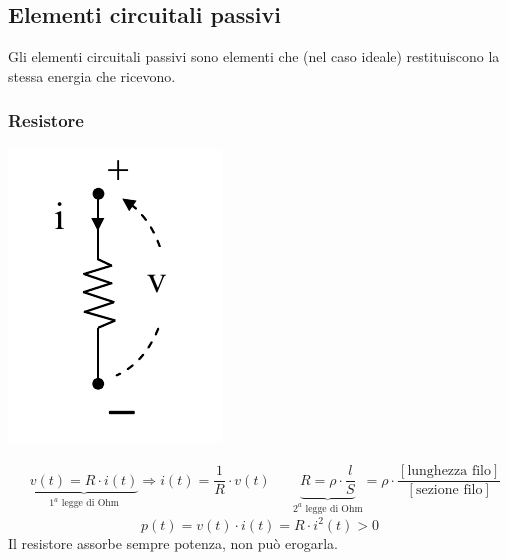 \documentclass{article}
\begin{document}
\subsection{Elementi circuitali passivi}
Gli elementi circuitali passivi sono elementi che (nel caso ideale) restituiscono la stessa energia che ricevono. 
\subsubsection{Resistore}
\begin{center}
    \includegraphics[scale=0.4]{Image/Resistore.png}
\end{center}
\begin{align*}
    &\underbrace{v(t) = R \cdot i(t)}_{1^a\text{ legge di Ohm}} \Longrightarrow i(t) = \dfrac{1}{R} \cdot v(t) & &\underbrace{R = \rho \cdot \dfrac{l}{S}}_{2^a \text{ legge di Ohm}} = \rho \cdot  \dfrac{[\text{lunghezza filo}]}{[\text{sezione filo}]}
\end{align*}
\[
    p(t) = v(t) \cdot i(t) = R \cdot i^2(t) >0
\]
Il resistore assorbe sempre potenza, non può erogarla.
\end{document}

